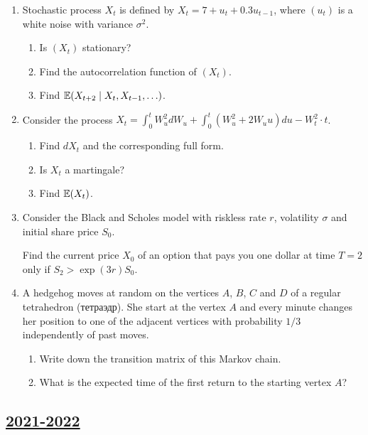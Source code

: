 \begin{enumerate}
\item Stochastic process $X_t$ is defined by $X_t = 7 + u_t + 0.3 u_{t-1}$, where $(u_t)$ is a white noise 
with variance $\sigma^2$.
\begin{enumerate}
    \item Is $(X_t)$ stationary? 
    \item Find the autocorrelation function of $(X_t)$.
    \item Find $\operatorname{\mathbb{E}}(X_{t+2} \mid X_t, X_{t-1}, \ldots)$.
\end{enumerate}

\item Consider the process $X_t = \int_0^t W_u^2 dW_u + \int_0^t (W_u^2 + 2W_u u ) du - W_t^2 \cdot t$.

\begin{enumerate}
    \item Find $dX_t$ and the corresponding full form. 
    \item Is $X_t$ a martingale?
    \item Find $\operatorname{\mathbb{E}}(X_t)$.
\end{enumerate}


\item Consider the Black and Scholes model with riskless rate $r$, volatility $\sigma$ and initial share price $S_0$. 

Find the current price $X_0$ of an option that pays you one dollar at time $T=2$ only if $S_2 > \exp(3r) S_0$.

\item A hedgehog moves at random on the vertices $A$, $B$, $C$ and $D$ of a regular tetrahedron (тетраэдр).
She start at the vertex $A$ and every minute changes her position to one of the adjacent vertices with probability $1/3$
independently of past moves. 

\begin{enumerate}
    \item Write down the transition matrix of this Markov chain. 
    \item What is the expected time of the first return to the starting vertex $A$?
\end{enumerate}

\end{enumerate}






\subsection[2021-2022]{\hyperref[sec:sol_kr_04_2021_2022]{2021-2022}}
\label{sec:kr_04_2021_2022} %

